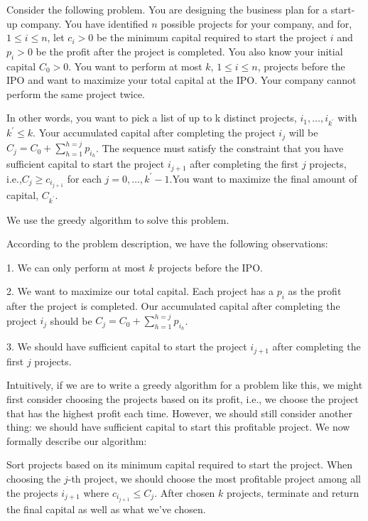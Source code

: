 \newpage
{} %

\problemdes

Consider the following problem. You are designing the business plan for a start-up company. You have identified $n$ possible projects for your company, and for, $1 \leq i \leq n$, let $c_i > 0$ be the minimum capital required to start the project $i$ and $p_i > 0$ be the profit after the project is completed. You also know your initial capital $C_0 > 0$. You want to perform at most $k$, $1 \leq i \leq n$, projects before the IPO and want to maximize your total capital at the IPO. Your company cannot perform the same project twice.

In other words, you want to pick a list of up to k distinct projects, $i_{1}, \ldots, i_{k^{\prime}}$ with $k^{\prime} \leq k$. Your accumulated capital after completing the project $i_j$ will be $C_{j}=C_{0}+\sum_{h=1}^{h=j} p_{i_{h}}$. The sequence must satisfy the constraint that you have sufficient capital to start the project $i_{j+1}$ after completing the first $j$ projects, i.e.,$C_j \geq c_{i_{j+1}}$ for each $j=0, \dots, k^{\prime}-1$.You want to maximize the final amount of capital, $C_{k^{\prime}}$.

\solution


We use the greedy algorithm to solve this problem.

According to the problem description, we have the following observations:

1. We can only perform at most $k$ projects before the IPO.

2. We want to maximize our total capital. Each project has a $p_i$ as the profit after the project is completed. Our accumulated capital after completing the project $i_j$ should be $C_j = C_0 + \sum_{h=1}^{h=j} p_{i_h}$.

3. We should have sufficient capital to start the project $i_{j+1}$ after completing the first $j$ projects.

Intuitively, if we are to write a greedy algorithm for a problem like this, we might first consider choosing the projects based on its profit, i.e., we choose the project that has the highest profit each time. However, we should still consider another thing: we should have sufficient capital to start this profitable project. We now formally describe our algorithm:

Sort projects based on its minimum capital required to start the project. When choosing the $j$-th project, we should choose the most profitable project among all the projects $i_{j+1}$ where $c_{i_{j+1}} \leq C_j$. After chosen $k$ projects, terminate and return the final capital as well as what we've chosen.

